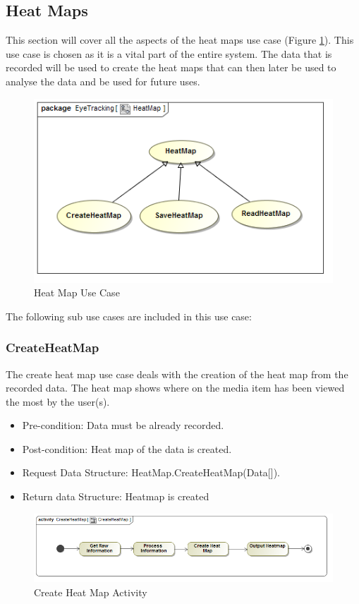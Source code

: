 \subsection{Heat Maps}
	This section will cover all the aspects of the heat maps use case (Figure \ref{HeatMapUseCase}). This use case is chosen as it is a vital part of the entire system. The data that is recorded will be used to create the heat maps that can then later be used to analyse the data and be used for future uses.
	\newline
	\begin{figure}[!ht]
		\centering
		\includegraphics[scale=0.5]{Diagrams/Use_Case_Diagram__HeatMap.png}
		\caption{Heat Map Use Case}
		\label{HeatMapUseCase}
	\end{figure}
	

	The following sub use cases are included in this use case:
	\subsubsection{CreateHeatMap}
The create heat map use case deals with the creation of the heat map from the recorded data. The heat map shows where on the media item has been viewed the most by the user(s).
	\begin{itemize}
		\item Pre-condition: Data must be already recorded.
		\item Post-condition: Heat map of the data is created.
		\item Request Data Structure: HeatMap.CreateHeatMap(Data[]).
		\item Return data Structure: Heatmap is created
	\end{itemize}
	\begin{figure}[!ht]
		\centering
		\includegraphics[scale=0.5]{Diagrams/Activity_Diagram__CreateHeatMap__CreateHeatMap.png}
		\caption{Create Heat Map Activity}
	\end{figure}
	
